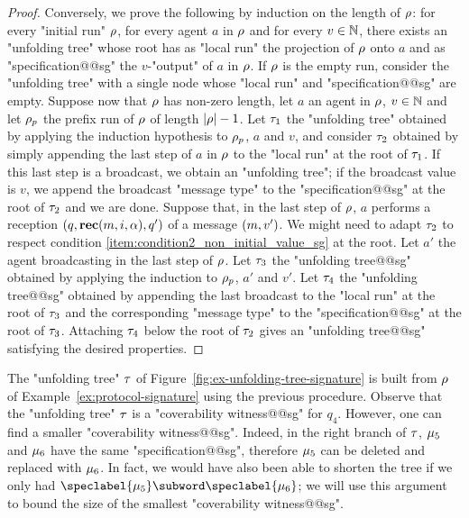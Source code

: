 \begin{proof}
Conversely, we prove the following by induction on the length of $\rho$: for every "initial run" $\rho$, for every agent $a$ in $\rho$ and for every $v \in \mathbb{N}$, there exists an "unfolding tree" whose root has as "local run" the projection of $\rho$ onto $a$ and as "specification@@sg" the $v$-"output" of $a$ in $\rho$. If $\rho$ is the empty run, consider the "unfolding tree" with a single node whose "local run" and "specification@@sg" are empty. Suppose now that $\rho$ has non-zero length, let $a$ an agent in $\rho$, $v \in \mathbb{N}$ and let $\rho_p$ the prefix run of $\rho$ of length $|\rho|-1$.
Let $\tau_1$ the "unfolding tree" obtained by applying the induction hypothesis to $\rho_p$, $a$ and $v$, and consider $\tau_2$ obtained by simply appending the last step of $a$ in $\rho$ to the "local run" at the root of $\tau_1$. If this last step is a broadcast, we obtain an "unfolding tree"; if the broadcast value is $v$, we append the broadcast "message type" to the "specification@@sg" at the root of $\tau_2$ and we are done. 
Suppose that, in the last step of $\rho$, $a$ performs a reception $(q, \textbf{rec}(m, i, \alpha),q')$ of a message $(m,v')$. We might need to adapt $\tau_2$ to respect condition \ref{item:condition2_non_initial_value_sg} at the root. Let $a'$ the agent broadcasting in the last step of $\rho$. Let $\tau_3$ the "unfolding tree@@sg" obtained by applying the induction to $\rho_p$, $a'$ and $v'$. Let $\tau_4$ the "unfolding tree@@sg" obtained by appending the last broadcast to the "local run" at the root of $\tau_3$ and the corresponding "message type" to the "specification@@sg" at the root of $\tau_3$. Attaching $\tau_4$ below the root of $\tau_2$ gives an "unfolding tree@@sg" satisfying the desired properties. 
\end{proof}


	The "unfolding tree" $\tau$ of Figure~\ref{fig:ex-unfolding-tree-signature} is built from $\rho$ of Example~\ref{ex:protocol-signature} using the previous procedure.
	 Observe that the "unfolding tree" $\tau$  is a "coverability witness@@sg" for $q_4$. However, one can find a smaller "coverability witness@@sg". 
	Indeed, in the right branch of $\tau$, $\mu_5$ and $\mu_6$ have the same "specification@@sg", therefore $\mu_5$ can be deleted and replaced with $\mu_6$. In fact, we would have also been able to shorten the tree if we only had $\speclabel{\node_5} \subword \speclabel{\node_6}$; we will use this argument to bound the size of the smallest "coverability witness@@sg".   

